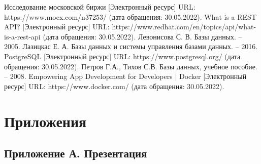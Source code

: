 




\def\bibname{Список использованных источников}
\begin{thebibliography}{9}
  \label{cha:biblio}  
   Исследование московской биржи [Электронный ресурс] URL: https://www.moex.com/n37253/ (дата обращения: 30.05.2022).
   What is a REST API? [Электронный ресурс] URL: https://www.redhat.com/en/topics/api/what-is-a-rest-api (дата обращения: 30.05.2022).
   Левонисова С. В. Базы данных. – 2005.
   Лазицкас Е. А. Базы данных и системы управления базами данных. – 2016.
   PostgreSQL [Электронный ресурс] URL: https://www.postgresql.org/ (дата обращения: 30.05.2022).
   Петров Г.А., Тихов С.В. Базы данных, учебное пособие. – 2008.
   Empowering App Development for Developers | Docker [Электронный ресурс] URL: https://www.docker.com/ (дата обращения: 30.05.2022).
\end{thebibliography}

\chapter*{Приложения}
\section*{Приложение А. Презентация}

